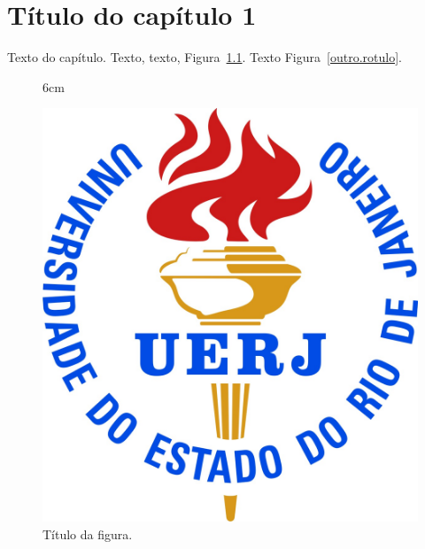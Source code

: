 \documentclass[a4paper,12pt,oneside,onecolumn,final,fleqn]{config/repUERJ}
\begin{document}
\chapter{T\'{i}tulo do cap\'{i}tulo 1}

Texto do capítulo. Texto, texto, Figura~\ref{rotulo}. Texto Figura~\ref{outro.rotulo}.


\begin{figure}[!ht]{6cm}
  \caption{Título da figura.}\label{rotulo}
  \includegraphics[width=\hsize]{images/logo_uerj_cor.jpg}
\end{figure}
\end{document}
